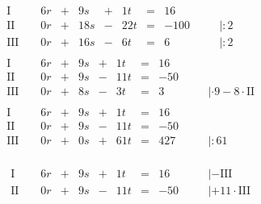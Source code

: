 \begin{exercise}
\begin{minipage}{0.49\linewidth}
\begin{align*}
    \\[1ex]&
    \begin{array}{r|rrrrrrrrrl}
      \text{I}{\,} & {\,} & \num{6}r & + &  \num{9}s & + &  \num{1}t & = &   \num{16} & {\quad} &           \\
     \text{II}{\,} & {\,} & \num{0}r & + & \num{18}s & - & \num{22}t & = & -\num{100} & {\quad} & |:\num{2} \\
    \text{III}{\,} & {\,} & \num{0}r & + & \num{16}s & - &  \num{6}t & = &    \num{6} & {\quad} & |:\num{2}
    \end{array}
    \\[1ex]&
    \begin{array}{r|rrrrrrrrrl}
      \text{I}{\,} & {\,} & \num{6}r & + & \num{9}s & + &  \num{1}t & = &  \num{16} & {\quad} &                                     \\
     \text{II}{\,} & {\,} & \num{0}r & + & \num{9}s & - & \num{11}t & = & -\num{50} & {\quad} &                                     \\
    \text{III}{\,} & {\,} & \num{0}r & + & \num{8}s & - &  \num{3}t & = &   \num{3} & {\quad} & |\cdot\num{9}-\num{8}\cdot\text{II}
    \end{array}
    \\[1ex]&
    \begin{array}{r|rrrrrrrrrl}
      \text{I}{\,} & {\,} & \num{6}r & + & \num{9}s & + &  \num{1}t & = &  \num{16} & {\quad} &            \\
     \text{II}{\,} & {\,} & \num{0}r & + & \num{9}s & - & \num{11}t & = & -\num{50} & {\quad} &            \\
    \text{III}{\,} & {\,} & \num{0}r & + & \num{0}s & + & \num{61}t & = & \num{427} & {\quad} & |:\num{61}
    \end{array}
    \end{align*}
    \end{minipage}%
    \hfill
    \begin{minipage}{0.49\linewidth}
    \vspace*{-\abovedisplayskip}
    \begin{align*}
    &
    \begin{array}{r|rrrrrrrrrl}
      \text{I}{\,} & {\,} & \num{6}r & + & \num{9}s & + &  \num{1}t & = &  \num{16} & {\quad} & |-\text{III}              \\
     \text{II}{\,} & {\,} & \num{0}r & + & \num{9}s & - & \num{11}t & = & -\num{50} & {\quad} & |+\num{11}\cdot\text{III} \\

\end{array}
\end{align*}
\end{minipage}
\end{exercise}
